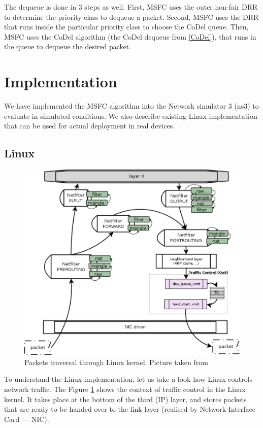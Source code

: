 The dequeue is done in 3 steps as well. First, MSFC uses the outer non-fair DRR to determine the priority class to dequeue a packet. Second, MSFC uses the DRR that runs inside the particular priority class to choose the CoDel queue. Then, MSFC uses the CoDel algorithm (the CoDel dequeue from \autoref{CoDel}), that runs in the queue to dequeue the desired packet.


\section {Implementation}

We have implemented the MSFC algorithm into the Network simulator 3 (ns3) to evaluate in simulated conditions. We also describe existing Linux implementation that can be used for actual deployment in real devices.

\subsection {Linux}
\begin{figure}
	\centering
	\includegraphics[width=137mm]{drawings/network_stack}
	\caption{Packets traversal through Linux kernel. Picture taken from \cite{linuxCore}}
	\label{fig12:linux}
\end{figure}

To understand the Linux implementation, let us take a look how Linux controls network traffic. The Figure \ref{fig12:linux} shows the context of traffic control in the Linux kernel. It takes place at the bottom of the third (IP) layer, and stores packets that are ready to be handed over to the link layer (realised by Network Interface Card --- NIC).

